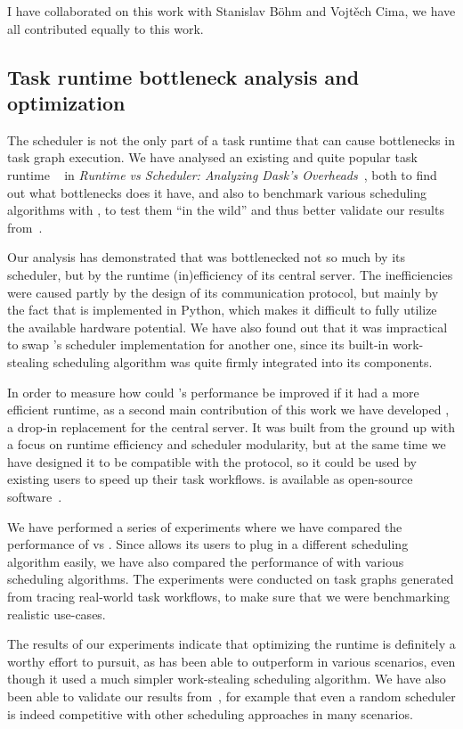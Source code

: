 I have collaborated on this work with Stanislav Böhm and Vojtěch Cima, we have all contributed
equally to this work.

\subsection{Task runtime bottleneck analysis and optimization}
The scheduler is not the only part of a task runtime that can cause bottlenecks in task graph
execution. We have analysed an existing and quite popular task runtime \dask{}~\cite{dask} in
\emph{Runtime vs Scheduler: Analyzing Dask's Overheads}~\cite{rsds}, both to find out what
bottlenecks does it have, and also to benchmark various scheduling algorithms with \dask{},
to test them ``in the wild'' and thus better validate our results from~\cite{estee}.

Our analysis has demonstrated that \dask{} was bottlenecked not so much by its scheduler, but
by the runtime (in)efficiency of its central server. The inefficiencies were caused partly by
the design of its communication protocol, but mainly by the fact that \dask{} is implemented in
Python, which makes it difficult to fully utilize the available hardware potential. We have
also found out that it was impractical to swap \dask{}'s scheduler implementation for another one,
since its built-in work-stealing scheduling algorithm was quite firmly integrated into its
components.

In order to measure how could \dask{}'s performance be improved if it had a more efficient runtime,
as a second main contribution of this work we have developed \rsds{}, a drop-in
replacement for the \dask{} central server. It was built from the ground up with a focus on
runtime efficiency and scheduler modularity, but at the same time we have designed it to be
compatible with the \dask{} protocol, so it could be used by existing \dask{} users to speed up
their task workflows. \rsds{} is available as open-source
software~.

We have performed a series of experiments where we have compared the performance of \rsds{} vs
\dask{}. Since \rsds{} allows its users to plug in a different scheduling algorithm easily, we
have also compared the performance of \rsds{} with various scheduling algorithms. The experiments
were conducted on task graphs generated from tracing real-world \dask{} task workflows, to make
sure that we were benchmarking realistic use-cases.

The results of our experiments indicate that optimizing the runtime is definitely a worthy effort
to pursuit, as \rsds{} has been able to outperform \dask{} in various scenarios, even though it
used a much simpler work-stealing scheduling algorithm. We have also been able to validate our
results from~\cite{estee}, for example that even a random scheduler is indeed competitive with
other scheduling approaches in many scenarios.

